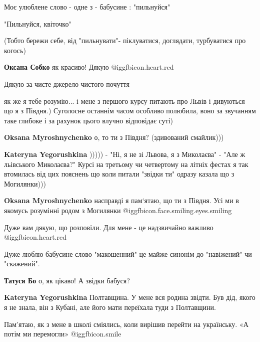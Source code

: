 \begin{itemize}
Моє улюблене слово - одне з - бабусине : "пильнуйся"

"Пильнуйся, квіточко"

(Тобто бережи себе, від "пильнувати"- піклуватися, доглядати, турбуватися про
когось)

\begin{itemize} %
\textbf{Оксана Собко} як красиво! Дякую @igg{fbicon.heart.red}
\end{itemize} %

Дякую за чисте джерело чистого почуття

як же я тебе розумію...
і мене з першого курсу питають про Львів і дивуються що я з Півдня.)
Суголосне останнім часом особливо полюбила, воно за звучанням таке глибоке і за рахунок цього влучно відповідає суті)

\begin{itemize} %
\textbf{Oksana Myroshnychenko} о, то ти з Півдня? (здивований смайлик)))

\textbf{Kateryna Yegorushkina} 
))))) - "Ні, я не зі Львова, я з Миколаєва" - "Але ж льівського Миколаєва?"
Курсі на третьому чи четвертому на літніх фестах я так
втомилась від цих пояснень що коли питали "звідки ти" одразу
казала що з Могилянки)))

\textbf{Oksana Myroshnychenko} насправді я пам‘ятаю, що ти з Півдня. Усі ми в якомусь розумінні родом з Могилянки @igg{fbicon.face.smiling.eyes.smiling} 
\end{itemize} %

Дуже вам дякую, що розповіли. Для мене - це надзвичайно важливо @igg{fbicon.heart.red}


Дуже люблю бабусине слово "макошенний" це майже синонім до "навіжений" чи "скажений".

\begin{itemize} %
\textbf{Татуся Бо} о, як цікаво! А звідки бабуся?


\textbf{Kateryna Yegorushkina} Полтавщина. У мене вся родина звідти. Був дід, якого я не знала, він з Кубані, але його мати переїхала туди з Полтавщини.
\end{itemize} %

Пам’ятаю, як з мене в школі сміялись, коли вирішив перейти на українську.
«А потім ми перемогли»  @igg{fbicon.smile} 


\end{itemize}
